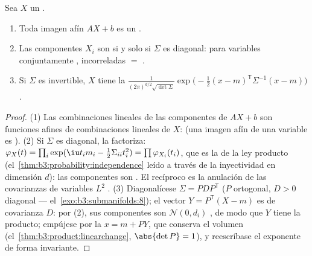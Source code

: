 \begin{theorem}\label{thm:b3:clt:gaussianvector}
Sea $X$ un .
\begin{enumerate}
  \item Toda imagen afín $AX + b$ es un
  . \item Las
  componentes $X_i$ son
  \emph{} si y
  solo si $\Sigma$ es diagonal: para variables conjuntamente
  , incorreladas $=$
  . \item Si
  $\Sigma$ es invertible, $X$ tiene la
        $\frac{1}{(2\pi)^{d/2}\sqrt{\det\Sigma}}
        \exp\bigl(-\frac12(x - m)^{\mathsf T}\Sigma^{-1}(x -
        m)\bigr)$.
\end{enumerate}
\end{theorem}

\begin{proof}
(1) Las combinaciones lineales de las componentes de $AX + b$ son
funciones afines de combinaciones lineales de $X$:
 (una imagen afín de una
variable  es
). (2) Si $\Sigma$ es
diagonal, la  factoriza:
$\varphi_X(t) = \prod_i\exp(\iu t_im_i -
\frac12\Sigma_{ii}t_i^2) = \prod\varphi_{X_i}(t_i)$, que es la
 de la ley producto
(el~\cref{thm:b3:probability:independence} leído a través de la
inyectividad en dimensión $d$): las componentes son
. El recíproco
es la anulación de las covarianzas de variables $L^2$
. (3)
Diagonalícese $\Sigma = P D P^{\mathsf T}$ ($P$ ortogonal, $D > 0$
diagonal --- el~\cref{exo:b3:submanifolds:8}); el vector
$Y = P^{\mathsf T}(X - m)$ es
 de covarianza $D$: por
(2), sus componentes son $\mathcal N(0, d_i)$
, de modo que
$Y$ tiene la  producto; empújese
por la $x = m + PY$, que conserva el volumen
(el~\cref{thm:b3:product:linearchange}, $\abs{\det P} = 1$), y
reescríbase el exponente de forma invariante.
\end{proof}

